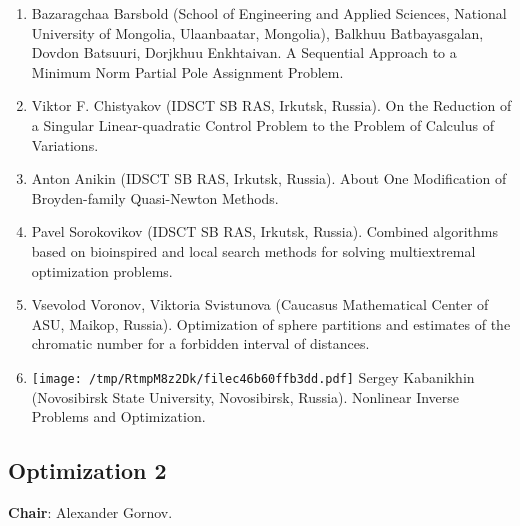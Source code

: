 \documentclass[
]{article}
\providecommand{\tightlist}{%
  \setlength{\itemsep}{0pt}\setlength{\parskip}{0pt}}
\begin{document}
\begin{enumerate}
\def\labelenumi{\arabic{enumi}.}
\tightlist
\item
  Bazaragchaa Barsbold (School of Engineering and Applied Sciences,
  National University of Mongolia, Ulaanbaatar, Mongolia), Balkhuu
  Batbayasgalan, Dovdon Batsuuri, Dorjkhuu Enkhtaivan. A Sequential
  Approach to a Minimum Norm Partial Pole Assignment Problem.
\item
  Viktor F. Chistyakov (IDSCT SB RAS, Irkutsk, Russia). On the Reduction
  of a Singular Linear-quadratic Control Problem to the Problem of
  Calculus of Variations.
\item
  Anton Anikin (IDSCT SB RAS, Irkutsk, Russia). About One Modification
  of Broyden-family Quasi-Newton Methods.
\item
  Pavel Sorokovikov (IDSCT SB RAS, Irkutsk, Russia). Combined algorithms
  based on bioinspired and local search methods for solving
  multiextremal optimization problems.
\item
  Vsevolod Voronov, Viktoria Svistunova (Caucasus Mathematical Center of
  ASU, Maikop, Russia). Optimization of sphere partitions and estimates
  of the chromatic number for a forbidden interval of distances.
\item
  \protect\texttt{[image: /tmp/RtmpM8z2Dk/filec46b60ffb3dd.pdf]}
  Sergey Kabanikhin (Novosibirsk State University, Novosibirsk, Russia).
  Nonlinear Inverse Problems and Optimization.
\end{enumerate}

\hypertarget{o2}{%
\subsection{Optimization 2}\label{o2}}

\textbf{Chair}: Alexander Gornov.
\end{document}
